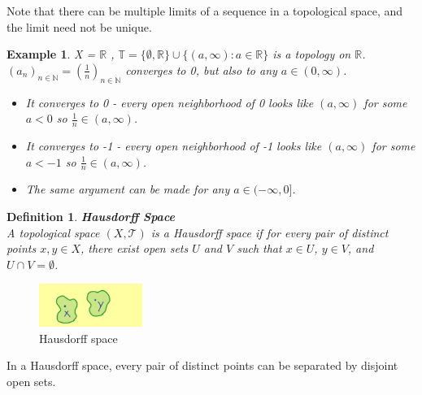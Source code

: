 \documentclass[11pt]{book} %
\newtheorem{definition}{Definition}[section]
\newtheorem*{example*}{Example}
\begin{document}
Note that there can be multiple limits of a sequence in a topological space, and the limit need not be unique.

\begin{example*}
    X = \( \mathbb{R} \) ,  \( \mathbb{T} = \{ \emptyset, \mathbb{R} \} \cup \{ ( a, \infty ) : a \in \mathbb{R} \} \) is a topology on \( \mathbb{R} \). \\
    \( (a_n)_{n \in \mathbb{N}} = (\frac{1}{n})_{n \in \mathbb{N}} \) converges to 0, but also to any \( a \in (0, \infty) \).
    \begin{itemize}
        \item It converges to 0 - every open neighborhood of 0 looks like \( (a, \infty) \) for some \( a < 0 \) so \( \frac{1}{n} \in (a, \infty) \).
        \item It converges to -1 - every open neighborhood of -1 looks like \( (a, \infty) \) for some \( a < -1 \) so \( \frac{1}{n} \in (a, \infty) \).
        \item The same argument can be made for any \( a \in (-\infty, 0] \).
    \end{itemize}
\end{example*}

\begin{definition}{\textbf{Hausdorff Space}} \\
    A topological space \( (X, \mathcal{T}) \) is a Hausdorff space if for every pair of distinct points \( x, y \in X \), there exist open sets \( U \) and \( V \) such that \( x \in U \), \( y \in V \), and \( U \cap V = \emptyset \).
\end{definition}

\begin{figure}[H]
    \centering
    \includegraphics[width=0.3\textwidth]{Figs/hausdorff_space.png}
    \caption{Hausdorff space}
\end{figure}

In a Hausdorff space, every pair of distinct points can be separated by disjoint open sets.

\end{document}
